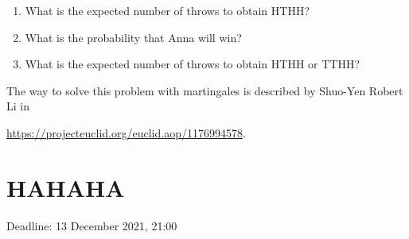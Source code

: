 \documentclass[12pt]{article}
\begin{document}
\begin{enumerate}
\begin{enumerate}
  \item What is the expected number of throws to obtain HTHH? 
  \item What is the probability that Anna will win?
  \item What is the expected number of throws to obtain HTHH or TTHH?
\end{enumerate}

The way to solve this problem with martingales is described by Shuo-Yen Robert Li in 

\url{https://projecteuclid.org/euclid.aop/1176994578}.

\end{enumerate}





\newpage
\section{HAHAHA}


Deadline: 13 December 2021, 21:00
\end{document}
